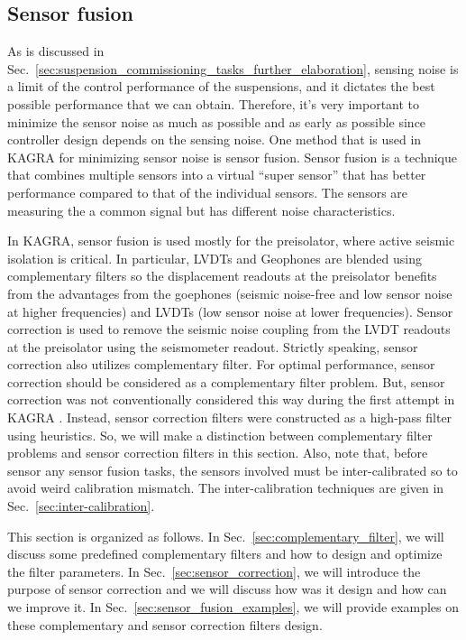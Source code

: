 \subsection{Sensor fusion}
As is discussed in Sec.~\ref{sec:suspension_commissioning_tasks_further_elaboration}, sensing noise is a limit of the control performance of the suspensions, and it dictates the best possible performance that we can obtain.
Therefore, it's very important to minimize the sensor noise as much as possible and as early as possible since controller design depends on the sensing noise.
One method that is used in KAGRA for minimizing sensor noise is sensor fusion.
Sensor fusion is a technique that combines multiple sensors into a virtual ``super sensor'' that has better performance compared to that of the individual sensors.
The sensors are measuring the a common signal but has different noise characteristics.

In KAGRA, sensor fusion is used mostly for the preisolator, where active seismic isolation is critical.
In particular, LVDTs and Geophones are blended using complementary filters so the displacement readouts at the preisolator benefits from the advantages from the goephones (seismic noise-free and low sensor noise at higher frequencies) and LVDTs (low sensor noise at lower frequencies).
Sensor correction is used to remove the seismic noise coupling from the LVDT readouts at the preisolator using the seismometer readout.
Strictly speaking, sensor correction also utilizes complementary filter.
For optimal performance, sensor correction should be considered as a complementary filter problem.
But, sensor correction was not conventionally considered this way during the first attempt in KAGRA \cite{sensor_correction_gain_tuning, comment_to_sensor_correction_gain_tuning}.
Instead, sensor correction filters were constructed as a high-pass filter using heuristics.
So, we will make a distinction between complementary filter problems and sensor correction filters in this section.
Also, note that, before sensor any sensor fusion tasks, the sensors involved must be inter-calibrated so to avoid weird calibration mismatch.
The inter-calibration techniques are given in Sec.~\ref{sec:inter-calibration}.

This section is organized as follows.
In Sec.~\ref{sec:complementary_filter}, we will discuss some predefined complementary filters and how to design and optimize the filter parameters.
In Sec.~\ref{sec:sensor_correction}, we will introduce the purpose of sensor correction and we will discuss how was it design and how can we improve it.
In Sec.~\ref{sec:sensor_fusion_examples}, we will provide examples on these complementary and sensor correction filters design.

